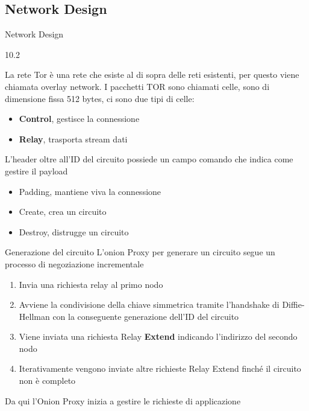 \subsection{Network Design}
\begin{frame}{Network Design}
    \begin{wrapfigure}{1}{0.2\textwidth}
        \centering
        
    \end{wrapfigure}

    La rete Tor è una rete che esiste al di sopra delle reti esistenti, per questo viene chiamata overlay network. I pacchetti TOR sono chiamati celle, sono di dimensione fissa 512 bytes, ci sono due tipi di celle:
    \begin{itemize}
        \item \textbf{Control}, gestisce la connessione
        \item \textbf{Relay}, trasporta stream dati
    \end{itemize}
    L'header oltre all'ID del circuito possiede un campo comando che indica come gestire il payload
    \begin{itemize}
        \item Padding, mantiene viva la connessione
        \item Create, crea un circuito
        \item Destroy, distrugge un circuito
    \end{itemize}
\end{frame}

\begin{frame}{Generazione del circuito}
    L'onion Proxy per generare un circuito segue un processo di negoziazione incrementale
    \begin{enumerate}
        \item Invia una richiesta relay al primo nodo
        \item Avviene la condivisione della chiave simmetrica tramite l'handshake di Diffie-Hellman con la conseguente generazione dell'ID del circuito
        \item Viene inviata una richiesta Relay \textbf{Extend} indicando l'indirizzo del secondo nodo
        \item Iterativamente vengono inviate altre richieste Relay Extend finché il circuito non è completo
    \end{enumerate}
    Da qui l'Onion Proxy inizia a gestire le richieste di applicazione
\end{frame}

